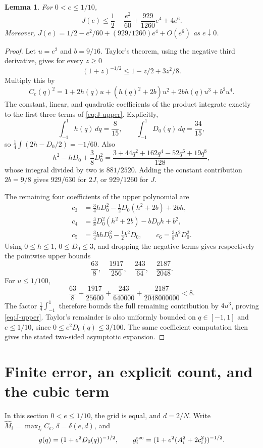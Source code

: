 \documentclass[11pt]{amsart}
\newtheorem{lemma}[theorem]{Lemma}
\theoremstyle{definition}
\theoremstyle{remark}
\begin{document}
\begin{lemma}\label{lem:integral}
For $0<e\le1/10$,
\begin{equation}\label{eq:J-upper}
 J(e)\le\frac12-\frac{e^2}{60}+\frac{929}{1260}e^4+4e^6.
\end{equation}
Moreover,
$J(e)=1/2-e^2/60+(929/1260)e^4+O(e^6)$ as $e\downarrow0$.
\end{lemma}
\begin{proof}
Let $u=e^2$ and $b=9/16$. Taylor's theorem, using the negative third
derivative, gives for every $z\ge0$
\[
 (1+z)^{-1/2}\le1-z/2+3z^2/8.
\]
Multiply this by
\[
 C_e(q)^2=1+2h(q)u+(h(q)^2+2b)u^2
                 +2bh(q)u^3+b^2u^4.
\]
The constant, linear, and quadratic coefficients of the product integrate
exactly to the first three terms of \eqref{eq:J-upper}. Explicitly,
\[
 \int_{-1}^1h(q)\,dq=\frac8{15},\qquad
 \int_{-1}^1D_0(q)\,dq=\frac{34}{15},
\]
so $\frac14\int(2h-D_0/2)=-1/60$. Also
\[
 h^2-hD_0+\frac38D_0^2
 =\frac{3+44q^2+162q^4-52q^6+19q^8}{128},
\]
whose integral divided by two is $881/2520$. Adding the constant
contribution $2b=9/8$ gives $929/630$ for $2J$, or $929/1260$
for $J$.

The remaining four coefficients of the upper polynomial are
\begin{align*}
 c_3&=\tfrac34hD_0^2-\tfrac12D_0(h^2+2b)+2bh,\\
 c_4&=\tfrac38D_0^2(h^2+2b)-bD_0h+b^2,\\
 c_5&=\tfrac34bhD_0^2-\tfrac12b^2D_0,\qquad
 c_6=\tfrac38b^2D_0^2.
\end{align*}
Using $0\le h\le1$, $0\le D_0\le3$, and dropping the negative
terms gives respectively the pointwise upper bounds
\[
 \frac{63}{8},\quad\frac{1917}{256},\quad
 \frac{243}{64},\quad\frac{2187}{2048}.
\]
For $u\le1/100$,
\[
 \frac{63}{8}+\frac{1917}{25600}
 +\frac{243}{640000}+\frac{2187}{2048000000}<8.
\]
The factor $\frac14\int_{-1}^1$ therefore bounds the full remaining
contribution by $4u^3$, proving \eqref{eq:J-upper}. Taylor's remainder
is also uniformly bounded on $q\in[-1,1]$ and $e\le1/10$, since
$0\le e^2D_0(q)\le3/100$. The same coefficient computation then
gives the stated two-sided asymptotic expansion.
\end{proof}

\section{Finite error, an explicit count, and the cubic term}

In this section $0<e\le1/10$, the grid is equal, and $d=2/N$.
Write $\widehat M_i=\max_{I_i}C_e$, $\delta=\delta(e,d)$, and
\[
 g(q)=(1+e^2D_0(q))^{-1/2},\qquad
 g_i^{\rm sec}=(1+e^2(A_i^2+2c_i^2))^{-1/2}.
\]
\end{document}
